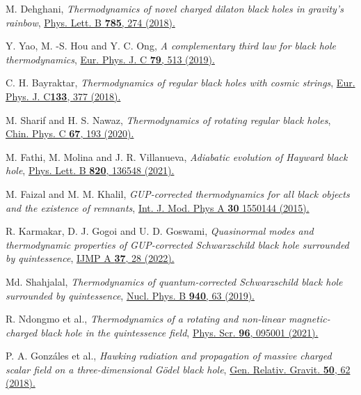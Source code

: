 \documentclass[aps,amsmath,amssymb,showpacs,showkeys]{revtex4}
\begin{document}
\begin{thebibliography}{99}
M. Dehghani, \textit{Thermodynamics of novel charged dilaton black holes in gravity's rainbow}, \href{https://doi.org/10.1016/j.physletb.2018.08.045}{Phys. Lett. B \textbf{785}, 274 (2018).}

Y. Yao, M. -S. Hou and Y. C. Ong, \textit{A complementary third law for black hole thermodynamics}, \href{https://doi.org/10.1140/epjc/s10052-019-7003-1}{Eur. Phys. J. C \textbf{79}, 513 (2019).}

C. H. Bayraktar, \textit{Thermodynamics of regular black holes with cosmic strings}, \href{https://doi.org/10.1140/epjp/i2018-12216-6}{Eur. Phys. J. C\textbf{133}, 377 (2018).}

M. Sharif and H. S. Nawaz, \textit{Thermodynamics of rotating regular black holes}, \href{https://doi.org/10.1016/j.cjph.2020.06.021}{Chin. Phys. C \textbf{67}, 193 (2020).}


M. Fathi, M. Molina and J. R. Villanueva, \textit{Adiabatic evolution of Hayward black hole}, \href{https://doi.org/10.1016/j.physletb.2021.136548}{Phys. Lett. B \textbf{820}, 136548 (2021).}

M. Faizal and M. M. Khalil, \textit{GUP-corrected thermodynamics for all black objects and the existence of remnants}, \href{https://www.worldscientific.com/doi/abs/10.1142/S0217751X15501444}{Int. J. Mod. Phys A \textbf{30} 1550144 (2015).}

R. Karmakar, D. J. Gogoi and U. D. Goswami, \textit{Quasinormal modes and thermodynamic properties of GUP-corrected Schwarzschild black hole surrounded by quintessence}, \href{https://www.worldscientific.com/doi/10.1142/S0217751X22501809}{IJMP A \textbf{37}, 28 (2022).}

Md. Shahjalal, \textit{Thermodynamics of quantum-corrected Schwarzschild black hole surrounded by quintessence}, \href{https://doi.org/10.1016/j.nuclphysb.2019.01.009}{Nucl. Phys. B \textbf{940}, 63 (2019).}

R. Ndongmo et al., \textit{Thermodynamics of a rotating and non-linear magnetic-charged black hole in the quintessence field}, \href{https://iopscience.iop.org/article/10.1088/1402-4896/ac0563}{Phys. Scr. \textbf{96}, 095001 (2021).}

P. A. Gonz\'ales et al., \textit{Hawking radiation and propagation of massive charged scalar field on a three-dimensional Gödel black hole}, \href{https://link.springer.com/article/10.1007/s10714-018-2389-x}{Gen. Relativ. Gravit. \textbf{50}, 62 (2018).}


\end{thebibliography}
\end{document}
